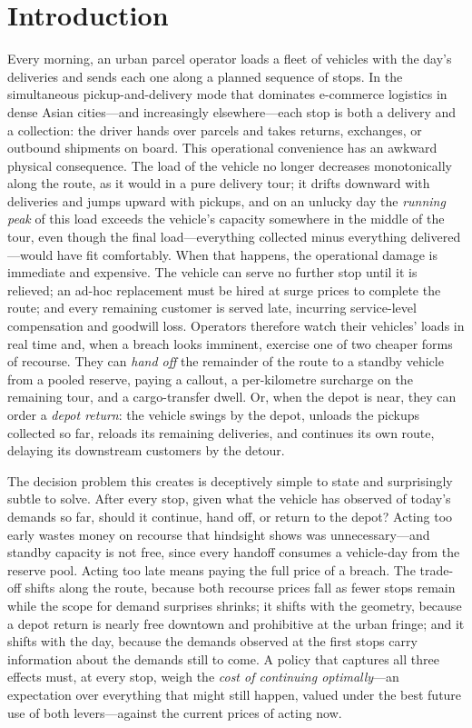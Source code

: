 \documentclass[preprint,authoryear,12pt]{elsarticle}
\theoremstyle{definition}
\theoremstyle{remark}
\begin{document}
\section{Introduction}\label{sec:intro}

Every morning, an urban parcel operator loads a fleet of vehicles with
the day's deliveries and sends each one along a planned sequence of
stops. In the simultaneous pickup-and-delivery mode that dominates
e-commerce logistics in dense Asian cities---and increasingly
elsewhere---each stop is both a delivery and a collection: the driver
hands over parcels and takes returns, exchanges, or outbound shipments
on board. This operational convenience has an awkward physical
consequence. The load of the vehicle no longer decreases monotonically
along the route, as it would in a pure delivery tour; it drifts
downward with deliveries and jumps upward with pickups, and on an
unlucky day the \emph{running peak} of this load exceeds the vehicle's
capacity somewhere in the middle of the tour, even though the final
load---everything collected minus everything delivered---would have fit
comfortably. When that happens, the operational damage is immediate and
expensive. The vehicle can serve no further stop until it is relieved;
an ad-hoc replacement must be hired at surge prices to complete the
route; and every remaining customer is served late, incurring
service-level compensation and goodwill loss. Operators therefore watch
their vehicles' loads in real time and, when a breach looks imminent,
exercise one of two cheaper forms of recourse. They can \emph{hand off}
the remainder of the route to a standby vehicle from a pooled reserve,
paying a callout, a per-kilometre surcharge on the remaining tour, and a
cargo-transfer dwell. Or, when the depot is near, they can order a
\emph{depot return}: the vehicle swings by the depot, unloads the
pickups collected so far, reloads its remaining deliveries, and
continues its own route, delaying its downstream customers by the
detour.

The decision problem this creates is deceptively simple to state and
surprisingly subtle to solve. After every stop, given what the vehicle
has observed of today's demands so far, should it continue, hand off, or
return to the depot? Acting too early wastes money on recourse that
hindsight shows was unnecessary---and standby capacity is not free, since
every handoff consumes a vehicle-day from the reserve pool. Acting too
late means paying the full price of a breach. The trade-off shifts along
the route, because both recourse prices fall as fewer stops remain while
the scope for demand surprises shrinks; it shifts with the geometry,
because a depot return is nearly free downtown and prohibitive at the
urban fringe; and it shifts with the day, because the demands observed at
the first stops carry information about the demands still to come. A
policy that captures all three effects must, at every stop, weigh the
\emph{cost of continuing optimally}---an expectation over everything that
might still happen, valued under the best future use of both
levers---against the current prices of acting now.
\end{document}
